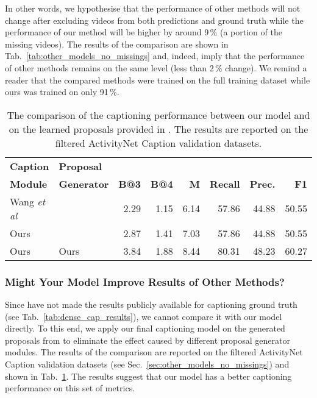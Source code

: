 \documentclass{src/bmvc2k}
\def\etal{\emph{et al}\bmvaOneDot}
\begin{document}
In other words, we hypothesise that the performance of other methods will not change after excluding videos from both predictions and ground truth while the performance of our method will be higher by around 9\,\% (a portion of the missing videos). The results of the comparison are shown in Tab.~\ref{tab:other_models_no_missings} and, indeed, imply that the performance of other methods remains on the same level (less than 2\,\% change). We remind a reader that the compared methods were trained on the full training dataset while ours was trained on only 91\,\%.

\begin{table}
\centering
\clearpage{}\begin{tabular}{l l rrr rrr}
\toprule
\textbf{Caption} & \textbf{Proposal} & & &  &  &  & \\
\textbf{Module} & \textbf{Generator} & \textbf{B@3} & \textbf{B@4} & \textbf{M} & \textbf{Recall} & \textbf{Prec.} & \textbf{F1} \\
\midrule
Wang \etal \cite{bafcg_Wang2018n} & \cite{bafcg_Wang2018n} & 2.29 & 1.15 & 6.14 & 57.86 & 44.88 & 50.55 \\
Ours & \cite{bafcg_Wang2018n} & 2.87 & 1.41 & 7.03 & 57.86 & 44.88 & 50.55 \\
Ours & Ours & 3.84 & 1.88 & 8.44 &  80.31 & 48.23 & 60.27 \\
\bottomrule
\end{tabular} \clearpage{}
\caption{The comparison of the captioning performance between our model and \cite{bafcg_Wang2018n} on the learned proposals provided in \cite{bafcg_Wang2018n}. The results are reported on the filtered ActivityNet Caption validation datasets. \label{tab:how_our_model_improves_other_results}}
\end{table}

\subsubsection{Might Your Model Improve Results of Other Methods?\label{sec:how_our_model_improves_other_results}}

Since \cite{bafcg_Wang2018n} have not made the results publicly available for captioning ground truth (see Tab.~\ref{tab:dense_cap_results}), we cannot compare it with our model directly. To this end, we apply our final captioning model on the generated proposals from \cite{bafcg_Wang2018n} to eliminate the effect caused by different proposal generator modules. The results of the comparison are reported on the filtered ActivityNet Caption validation datasets (see Sec.~\ref{sec:other_models_no_missings}) and shown in Tab.~\ref{tab:how_our_model_improves_other_results}. The results suggest that our model has a better captioning performance on this set of metrics.
\end{document}
